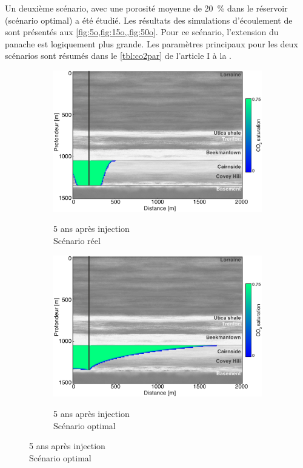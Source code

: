Un deuxième scénario, avec une porosité moyenne de \SI{20}{\percent} dans le réservoir (scénario optimal) a été étudié. Les résultats des simulations d'écoulement de  sont présentés aux \cref{fig:5o,fig:15o,,fig:50o}. Pour ce scénario, l'extension du panache est logiquement plus grande. Les paramètres principaux pour les deux scénarios sont résumés dans le \cref{tbl:co2par} de l'article I à la .
\begin{figure}[!ht]
        \centering
        \begin{subfigure}[b]{.47\textwidth}
                \caption{5 ans après injection \\ Scénario réel }
                \includegraphics[width=\textwidth]{fig/5r.pdf}
                \label{fig:5r}
        \end{subfigure}
        \qquad
        \begin{subfigure}[b]{.47\textwidth}
                \caption{5 ans après injection \\ Scénario optimal}
                \includegraphics[width=\textwidth]{fig/5o.pdf}
                \label{fig:5o}
        \end{subfigure}
    

\end{figure}
